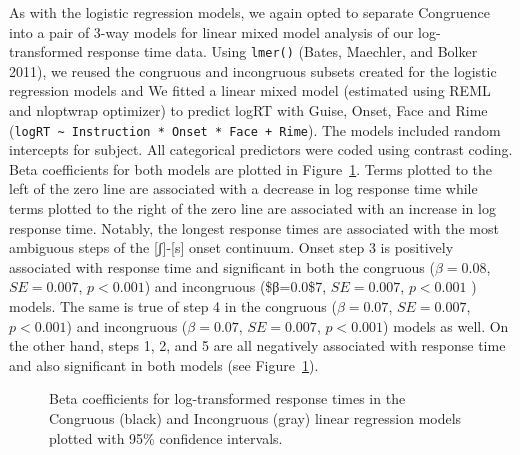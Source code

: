 \documentclass[
  letterpaper,
  DIV=11,
  numbers=noendperiod]{scrartcl}
\begin{document}
As with the logistic regression models, we again opted to separate
Congruence into a pair of 3-way models for linear mixed model analysis
of our log-transformed response time data. Using \texttt{lmer()} (Bates,
Maechler, and Bolker 2011), we reused the congruous and incongruous
subsets created for the logistic regression models and We fitted a
linear mixed model (estimated using REML and nloptwrap optimizer) to
predict logRT with Guise, Onset, Face and Rime
(\texttt{logRT\ \textasciitilde{}\ Instruction\ *\ Onset\ *\ Face\ +\ Rime}).
The models included random intercepts for subject. All categorical
predictors were coded using contrast coding. Beta coefficients for both
models are plotted in Figure~\ref{fig-coefs-logRT}. Terms plotted to the
left of the zero line are associated with a decrease in log response
time while terms plotted to the right of the zero line are associated
with an increase in log response time. Notably, the longest response
times are associated with the most ambiguous steps of the
{[}ʃ{]}-{[}s{]} onset continuum. Onset step 3 is positively associated
with response time and significant in both the congruous (\(β=0.08\),
\(SE=0.007\), \(p < 0.001\)) and incongruous (\$β=0.0\$7, \(SE=0.007\),
\(p < 0.001\) ) models. The same is true of step 4 in the congruous
(\(β=0.07\), \(SE=0.007\), \(p < 0.001\)) and incongruous (\(β=0.07\),
\(SE=0.007\), \(p < 0.001\)) models as well. On the other hand, steps 1,
2, and 5 are all negatively associated with response time and also
significant in both models (see Figure~\ref{fig-coefs-logRT}).

\begin{figure}


\caption{\label{fig-coefs-logRT}Beta coefficients for log-transformed
response times in the Congruous (black) and Incongruous (gray) linear
regression models plotted with 95\% confidence intervals.}

\end{figure}%
\end{document}
